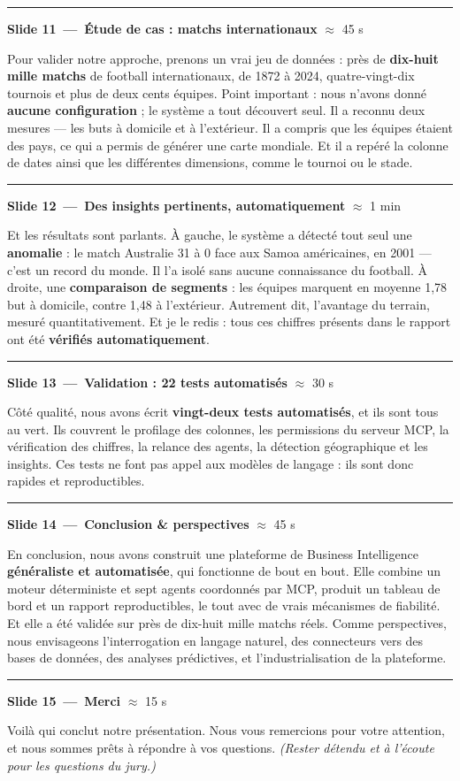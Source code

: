 \documentclass[11pt,a4paper]{article}
\newcommand{\slidecue}[3]{%
  \needspace{4\baselineskip}%
  \medskip\par\noindent
  {\color{accentdark}\rule[-3pt]{4pt}{17pt}}\hspace{8pt}%
  {\large\bfseries\color{ink}Slide #1\, — \,#2}%
  \hfill{\small\color{muted}#3}\par
  \nopagebreak\smallskip}
\newcommand{\cue}[1]{{\itshape\color{muted}#1}}
\begin{document}
\slidecue{11}{Étude de cas : matchs internationaux}{$\approx$ 45 s}
Pour valider notre approche, prenons un vrai jeu de données : près de
\textbf{dix-huit mille matchs} de football internationaux, de 1872 à 2024,
quatre-vingt-dix tournois et plus de deux cents équipes. Point important : nous
n'avons donné \textbf{aucune configuration} ; le système a tout découvert seul.
Il a reconnu deux mesures — les buts à domicile et à l'extérieur. Il a compris
que les équipes étaient des pays, ce qui a permis de générer une carte mondiale.
Et il a repéré la colonne de dates ainsi que les différentes dimensions, comme
le tournoi ou le stade.

\slidecue{12}{Des insights pertinents, automatiquement}{$\approx$ 1 min}
Et les résultats sont parlants. À gauche, le système a détecté tout seul une
\textbf{anomalie} : le match Australie 31 à 0 face aux Samoa américaines, en
2001 — c'est un record du monde. Il l'a isolé sans aucune connaissance du
football. À droite, une \textbf{comparaison de segments} : les équipes marquent
en moyenne 1,78 but à domicile, contre 1,48 à l'extérieur. Autrement dit,
l'avantage du terrain, mesuré quantitativement. Et je le redis : tous ces
chiffres présents dans le rapport ont été \textbf{vérifiés automatiquement}.

\slidecue{13}{Validation : 22 tests automatisés}{$\approx$ 30 s}
Côté qualité, nous avons écrit \textbf{vingt-deux tests automatisés}, et ils
sont tous au vert. Ils couvrent le profilage des colonnes, les permissions du
serveur MCP, la vérification des chiffres, la relance des agents, la détection
géographique et les insights. Ces tests ne font pas appel aux modèles de
langage : ils sont donc rapides et reproductibles.

\slidecue{14}{Conclusion \& perspectives}{$\approx$ 45 s}
En conclusion, nous avons construit une plateforme de Business Intelligence
\textbf{généraliste et automatisée}, qui fonctionne de bout en bout. Elle
combine un moteur déterministe et sept agents coordonnés par MCP, produit un
tableau de bord et un rapport reproductibles, le tout avec de vrais mécanismes
de fiabilité. Et elle a été validée sur près de dix-huit mille matchs réels.
Comme perspectives, nous envisageons l'interrogation en langage naturel, des
connecteurs vers des bases de données, des analyses prédictives, et
l'industrialisation de la plateforme.

\slidecue{15}{Merci}{$\approx$ 15 s}
Voilà qui conclut notre présentation. Nous vous remercions pour votre attention,
et nous sommes prêts à répondre à vos questions. \cue{(Rester détendu et à
l'écoute pour les questions du jury.)}
\end{document}
